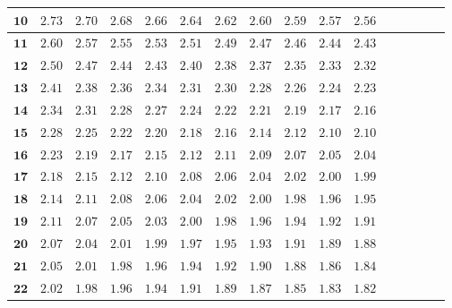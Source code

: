 \begin{customTableWrapper}{1.4}
\begin{longtable}{|r|r|r|r|r|r|r|r|r|r|r|r|r|r|r|r|}
    ${\mathbf{10}}$ & ${2.73}$   & ${2.70}$   & ${2.68}$   & ${2.66}$   & ${2.64}$   & ${2.62}$   & ${2.60}$   & ${2.59}$   & ${2.57}$   & ${2.56}$   \\ \hline 
    ${\mathbf{11}}$ & ${2.60}$   & ${2.57}$   & ${2.55}$   & ${2.53}$   & ${2.51}$   & ${2.49}$   & ${2.47}$   & ${2.46}$   & ${2.44}$   & ${2.43}$   \\ \hline 
    ${\mathbf{12}}$ & ${2.50}$   & ${2.47}$   & ${2.44}$   & ${2.43}$   & ${2.40}$   & ${2.38}$   & ${2.37}$   & ${2.35}$   & ${2.33}$   & ${2.32}$   \\ \hline 
    ${\mathbf{13}}$ & ${2.41}$   & ${2.38}$   & ${2.36}$   & ${2.34}$   & ${2.31}$   & ${2.30}$   & ${2.28}$   & ${2.26}$   & ${2.24}$   & ${2.23}$   \\ \hline 
    ${\mathbf{14}}$ & ${2.34}$   & ${2.31}$   & ${2.28}$   & ${2.27}$   & ${2.24}$   & ${2.22}$   & ${2.21}$   & ${2.19}$   & ${2.17}$   & ${2.16}$   \\ \hline 
    ${\mathbf{15}}$ & ${2.28}$   & ${2.25}$   & ${2.22}$   & ${2.20}$   & ${2.18}$   & ${2.16}$   & ${2.14}$   & ${2.12}$   & ${2.10}$   & ${2.10}$   \\ \hline 
    ${\mathbf{16}}$ & ${2.23}$   & ${2.19}$   & ${2.17}$   & ${2.15}$   & ${2.12}$   & ${2.11}$   & ${2.09}$   & ${2.07}$   & ${2.05}$   & ${2.04}$   \\ \hline 
    ${\mathbf{17}}$ & ${2.18}$   & ${2.15}$   & ${2.12}$   & ${2.10}$   & ${2.08}$   & ${2.06}$   & ${2.04}$   & ${2.02}$   & ${2.00}$   & ${1.99}$   \\ \hline 
    ${\mathbf{18}}$ & ${2.14}$   & ${2.11}$   & ${2.08}$   & ${2.06}$   & ${2.04}$   & ${2.02}$   & ${2.00}$   & ${1.98}$   & ${1.96}$   & ${1.95}$   \\ \hline 
    ${\mathbf{19}}$ & ${2.11}$   & ${2.07}$   & ${2.05}$   & ${2.03}$   & ${2.00}$   & ${1.98}$   & ${1.96}$   & ${1.94}$   & ${1.92}$   & ${1.91}$   \\ \hline 
    ${\mathbf{20}}$ & ${2.07}$   & ${2.04}$   & ${2.01}$   & ${1.99}$   & ${1.97}$   & ${1.95}$   & ${1.93}$   & ${1.91}$   & ${1.89}$   & ${1.88}$   \\ \hline 
    ${\mathbf{21}}$ & ${2.05}$   & ${2.01}$   & ${1.98}$   & ${1.96}$   & ${1.94}$   & ${1.92}$   & ${1.90}$   & ${1.88}$   & ${1.86}$   & ${1.84}$   \\ \hline 
    ${\mathbf{22}}$ & ${2.02}$   & ${1.98}$   & ${1.96}$   & ${1.94}$   & ${1.91}$   & ${1.89}$   & ${1.87}$   & ${1.85}$   & ${1.83}$   & ${1.82}$   \\ \hline 

\end{longtable}
\end{customTableWrapper}
